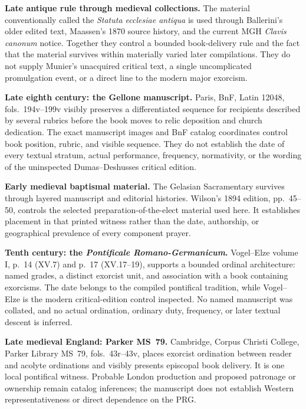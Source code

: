 \noindent\textbf{Late antique rule through medieval collections.}
The material conventionally called the \emph{Statuta ecclesiae antiqua} is
used through Ballerini's older edited text, Maassen's 1870 source history, and
the current MGH \emph{Clavis canonum} notice. Together they control a bounded
book-delivery rule and the fact that the material survives within materially
varied later compilations. They do not supply Munier's unacquired critical
text, a single uncomplicated promulgation event, or a direct line to the
modern major exorcism.

\medskip\noindent\textbf{Late eighth century: the Gellone manuscript.}
Paris, BnF, Latin 12048, fols.~194v--199v visibly preserves a differentiated
sequence for recipients described by several rubrics before the book moves to
relic deposition and church dedication. The exact manuscript images and BnF
catalog coordinates control book position, rubric, and visible sequence. They
do not establish the date of every textual stratum, actual performance,
frequency, normativity, or the wording of the uninspected Dumas--Deshusses
critical edition.

\medskip\noindent\textbf{Early medieval baptismal material.}
The Gelasian Sacramentary survives through layered manuscript and editorial
histories. Wilson's 1894 edition, pp.~45--50, controls the selected
preparation-of-the-elect material used here. It establishes placement in that
printed witness rather than the date, authorship, or geographical prevalence
of every component prayer.

\medskip\noindent\textbf{Tenth century: the
\emph{Pontificale Romano-Germanicum}.}
Vogel--Elze volume I, p.~14 (XV.7) and p.~17 (XV.17--19), supports a bounded
ordinal architecture: named grades, a distinct exorcist unit, and association
with a book containing exorcisms. The date belongs to the compiled pontifical
tradition, while Vogel--Elze is the modern critical-edition control inspected.
No named manuscript was collated, and no actual ordination, ordinary duty,
frequency, or later textual descent is inferred.

\medskip\noindent\textbf{Late medieval England: Parker MS~79.}
Cambridge, Corpus Christi College, Parker Library MS~79, fols.~43r--43v,
places exorcist ordination between reader and acolyte ordinations and visibly
presents episcopal book delivery. It is one local pontifical witness.
Probable London production and proposed patronage or ownership remain catalog
inferences; the manuscript does not establish Western representativeness or
direct dependence on the PRG.

